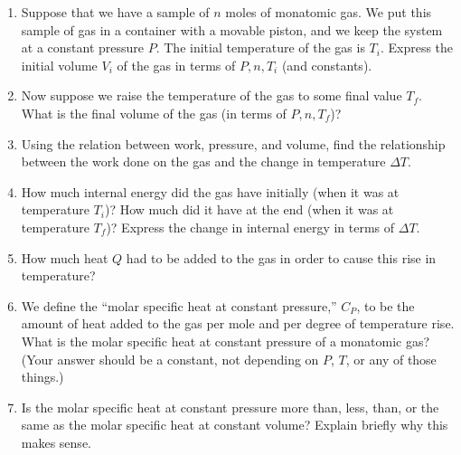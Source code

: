\begin{enumerate}[labparts]

\item Suppose that we have a sample of $n$ moles of monatomic gas.
We put this sample of gas in a container with a movable
piston, and we keep the system at a constant pressure $P$.  The initial
temperature of the gas is $T_i$.  Express the initial volume $V_i$ of 
the gas in terms of $P,n,T_i$ (and constants).  

\answerspace{0.8in}

\item Now suppose we raise the temperature of the gas to some final value
$T_f$.  What is the final volume of the gas (in terms of $P,n,T_f$)?

\answerspace{0.8in}

\item Using the relation between work, pressure, and volume, find
the relationship between the work done on the gas and the change in temperature
$\Delta T$.

\answerspace{1in}%

\item How much internal energy did the gas have initially (when it
was at temperature $T_i$)?  How much did it have at the end (when
it was at temperature $T_f$)?  Express the change in internal energy
in terms of $\Delta T$.

\answerspace{1.1in}%

\item How much heat $Q$ had to be added to the gas in order to cause
this rise in temperature?  

\answerspace{1.1in}

\pagebreak[3]
\item We define the ``molar specific heat at constant pressure,''
$C_P$, to be the amount of heat added to the gas per mole and per
degree of temperature rise.  What is the molar specific heat at
constant pressure of a monatomic gas?  (Your answer should be a
constant, not depending on $P$, $T$, or any of those things.)

\answerspace{1.4in}

\item Is the molar specific heat at constant pressure more than, less, than, or
the same as the molar specific heat at constant volume?  Explain
briefly why this makes sense.

\answerspace{1.4in}
\end{enumerate}

